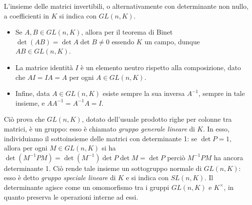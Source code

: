 L'insieme delle matrici invertibili, o alternativamente con determinante non nullo, a coefficienti in $K$ si indica con $GL(n,K)$.
\begin{itemize}
	\item Se $A,B\in GL(n,K)$, allora per il teorema di Binet $\det(AB)=\det A\det B\ne 0$ essendo $K$ un campo, dunque $AB\in GL(n,K)$.
	\item La matrice identità $I$ è un elemento neutro rispetto alla composizione, dato che $AI=IA=A$ per ogni $A\in GL(n,K)$.
	\item Infine, data $A\in GL(n,K)$ esiste sempre la sua inversa $A^{-1}$, sempre in tale insieme, e $AA^{-1}=A^{-1}A=I$.
\end{itemize}
Ciò prova che $GL(n,K)$, dotato dell'usuale prodotto righe per colonne tra matrici, è un gruppo: esso è chiamato \emph{gruppo generale lineare} di $K$.
In esso, individuiamo il sottoinsieme delle matrici con determinante 1: se $\det P=1$, allora per ogni $M\in GL(n,K)$ si ha $\det(M^{-1}PM)=\det(M^{-1})\det P\det M=\det P$ perciò $M^{-1}PM$ ha ancora determinante 1.
Ciò rende tale insieme un sottogruppo normale di $GL(n,K)$: esso è detto \emph{gruppo speciale lineare} di $K$ e si indica con $SL(n,K)$.
Il determinante agisce come un omomorfismo tra i gruppi $GL(n,K)$ e $K^\times$, in quanto preserva le operazioni interne ad essi.

